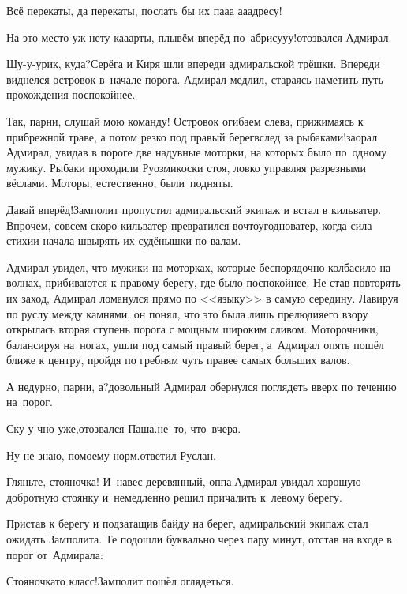 \diagdash Всё перекаты, да перекаты, послать бы их па\sdash а\sdash а а\sdash а\sdash адресу!

\diagdash На это место уж нету ка\sdash а\sdash арты, плывём вперёд по~абрису\sdash у\sdash у!\mdash отозвался Адмирал.

\diagdash Шу-у-урик, куда?\mdash Серёга и Киря шли впереди адмиральской трёшки. Впереди виднелся островок в~начале порога. Адмирал медлил, стараясь наметить путь прохождения поспокойнее.

\diagdash Так, парни, слушай мою команду! Островок огибаем слева, прижимаясь к прибрежной траве, а потом резко под правый берег\mdash вслед за рыбаками!\mdash заорал Адмирал, увидав в пороге две надувные моторки, на которых было по~одному мужику. Рыбаки проходили Руозмикоски стоя, ловко управляя разрезными вёслами. Моторы, естественно, были~подняты.

\diagdash Давай вперёд!\mdash Замполит пропустил адмиральский экипаж и встал в кильватер. Впрочем, совсем скоро кильватер превратился во\sdash что\sdash угодно\sdash ватер, когда сила стихии начала швырять их судёнышки по валам.

Адмирал увидел, что мужики на моторках, которые беспорядочно колбасило на волнах, прибиваются к правому берегу, где было поспокойнее. Не став повторять их заход, Адмирал ломанулся прямо по <<языку>> в самую середину. Лавируя по руслу между камнями, он понял, что это была лишь прелюдия\mdash его взору открылась вторая ступень порога с мощным широким сливом. Моторочники, балансируя на~ногах, ушли под самый правый берег, а~Адмирал опять пошёл ближе к центру, пройдя по гребням чуть правее самых больших валов. 

\diagdash А недурно, парни, а?\mdash довольный Адмирал обернулся поглядеть вверх по течению на~порог.

\diagdash Ску-у-чно уже,\mdash отозвался Паша.\mdash не~то, что~вчера.

\diagdash Ну не знаю, по\sdash моему норм.\mdash ответил Руслан.

\diagdash Гляньте, стояночка! И~навес деревянный, оп\sdash па.\mdash Адмирал увидал хорошую добротную стоянку и~немедленно решил причалить к~левому берегу.

Пристав к берегу и подзатащив байду на берег, адмиральский экипаж стал ожидать Замполита. Те подошли буквально через пару минут, отстав на входе в порог от~Адмирала:

\diagdash Стояночка\sdash то класс!\mdash Замполит пошёл оглядеться.

